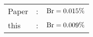       \begin{tabular}{lcr}
          Paper &:& $\mathrm{Br}  = 0.015\%$ \\
          this      &:& $\mathrm{Br}  = 0.009\%$ \\        
      \end{tabular}
